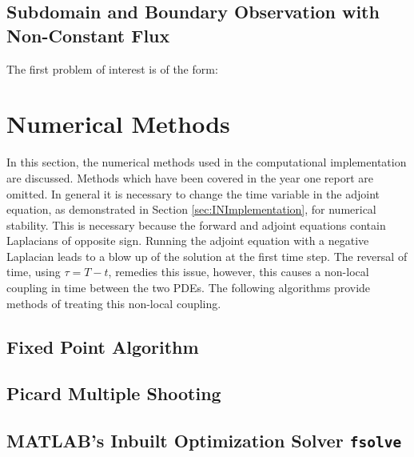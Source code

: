 \documentclass[11pt, a4paper]{article}
\theoremstyle{definition}
\begin{document}
	

\subsection{Subdomain and Boundary Observation with Non-Constant Flux}

The first problem of interest is of the form:


	
	
	
\section{Numerical Methods} \label{sec:NumericalMethods}	
	
	In this section, the numerical methods used in the computational implementation are discussed. Methods which have been covered in the year one report are omitted.
	In general it is necessary to change the time variable in the adjoint equation, as demonstrated in Section \ref{sec:INImplementation}, for numerical stability. This is necessary because the forward and adjoint equations contain Laplacians of opposite sign. Running the adjoint equation with a negative Laplacian leads to a blow up of the solution at the first time step. The reversal of time, using $\tau = T-t$, remedies this issue, however, this causes a non-local coupling in time between the two PDEs.
	The following algorithms provide methods of treating this non-local coupling.
	
	\subsection{Fixed Point Algorithm}\label{sec:Method_SolverFP}
	
	
	
	\subsection{Picard Multiple Shooting}
	
	
	
	\subsection{{\scshape MATLAB}'s Inbuilt Optimization Solver \texttt{fsolve}} \label{sec:fsolvedescription}
	
	
	
\end{document}
